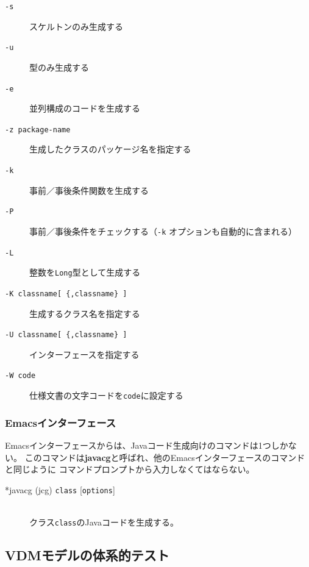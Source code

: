 \documentclass[\pformat,12pt]{jarticle}
\newcommand{\OptPt}[1]{[\ #1\ ]}
\begin{document}
\begin{description}
\item[{\tt -s}] スケルトンのみ生成する

\item[{\tt -u}] 型のみ生成する

\item[{\tt -e}] 並列構成のコードを生成する

\item[{\tt -z package-name}] 生成したクラスのパッケージ名を指定する

\item[{\tt -k}] 事前／事後条件関数を生成する

\item[{\tt -P}] 事前／事後条件をチェックする（{\tt -k} オプションも自動的に含まれる）

\item[{\tt -L}] 整数を{\tt Long}型として生成する

\item[{\tt -K classname\OptPt{\{,classname\}}}] 生成するクラス名を指定する

\item[{\tt -U classname\OptPt{\{,classname\}}}] インターフェースを指定する

\item[{\tt -W code}] 仕様文書の文字コードを{\tt code}に設定する
\end{description}

\subsubsection{Emacsインターフェース}

Emacsインターフェースからは、Javaコード生成向けのコマンドは1つしかない。
このコマンドは\textbf{javacg}と呼ばれ、他のEmacsインターフェースのコマンドと同じように
コマンドプロンプトから入力しなくてはならない。

\begin{description}
\item[*javacg (jcg) {\tt class} {[}{\tt options}{]}] 
  \mbox{}\\
  クラス{\tt class}のJavaコードを生成する。
\end{description}

\newpage
\subsection{VDMモデルの体系的テスト}\label{sec:testing}
\label{vdmtc} 
\end{document}
